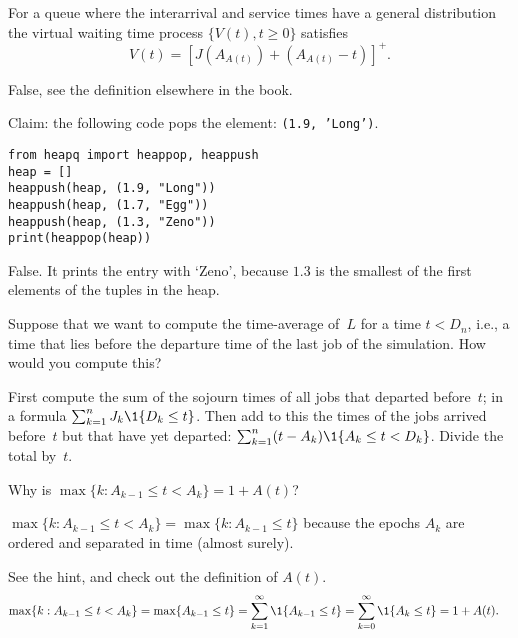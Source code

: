 \documentclass[stochastic-or.tex]{subfiles}
\begin{document}
\begin{truefalse}
For a queue where the interarrival and service times have a general distribution the virtual waiting time process $\{V(t), t\geq 0\}$
satisfies
 \begin{equation*}
 V(t) = [J(A_{A(t)}) + (A_{A(t)}-t)]^+.
 \end{equation*}
\begin{solution} False, see the definition elsewhere in the book.
\end{solution}
\end{truefalse}



\begin{truefalse}
Claim: the following code pops the element: \texttt{(1.9, 'Long')}.
\begin{verbatim}
from heapq import heappop, heappush
heap = []
heappush(heap, (1.9, "Long"))
heappush(heap, (1.7, "Egg"))
heappush(heap, (1.3, "Zeno"))
print(heappop(heap))
\end{verbatim}
\begin{solution}
    False. It prints the entry with `Zeno', because $1.3$ is the smallest of the first elements of the tuples in the heap.
\end{solution}
\end{truefalse}




\begin{exercise}
Suppose that we want to compute the time-average of~$L$ for a time $t<D_{n}$, i.e., a time that lies before the departure time of the last job of the simulation. How would you compute this?
\begin{solution}
First compute the sum of the sojourn times of all jobs that departed before~$t$; in a formula $\sum_{k=1}^{n}J_k \1{D_k\leq t}$. Then add to this the times of the jobs arrived before~$t$  but that have yet departed:  $\sum_{k=1}^n (t-A_k)\1{A_k\leq t < D_{k}}$. Divide the total by~$t$.
\end{solution}
\end{exercise}

\begin{exercise}\label{ex:55}
Why is $\max\{k: A_{k-1} \leq t < A_{k}\} = 1 + A(t)$?
\begin{hint}
$\max\{k: A_{k-1} \leq t < A_{k}\} = \max\{k : A_{k-1} \leq t\}$ because the epochs $A_{k}$ are ordered and separated  in time (almost surely).
\end{hint}
\begin{solution}
See the hint, and check out the definition of $A(t)$.
\begin{align*}
  \max\{k: A_{k-1} \leq t < A_{k}\} &= \max\{A_{k-1} \leq t\} = \sum_{k=1}^{\infty} \1{A_{k-1}\leq t} = \sum_{k=0}^{\infty} \1{A_{k}\leq t}  =  1 + A(t).
\end{align*}
\end{solution}
\end{exercise}



\end{document}

